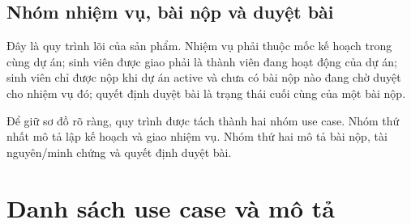 \figProjectTeamUseCases

\subsection{Nhóm nhiệm vụ, bài nộp và duyệt bài}

Đây là quy trình lõi của sản phẩm. Nhiệm vụ phải thuộc mốc kế hoạch trong cùng dự án; sinh viên được giao phải là thành viên đang hoạt động của dự án; sinh viên chỉ được nộp khi dự án active và chưa có bài nộp nào đang chờ duyệt cho nhiệm vụ đó; quyết định duyệt bài là trạng thái cuối cùng của một bài nộp.

Để giữ sơ đồ rõ ràng, quy trình được tách thành hai nhóm use case. Nhóm thứ nhất mô tả lập kế hoạch và giao nhiệm vụ. Nhóm thứ hai mô tả bài nộp, tài nguyên/minh chứng và quyết định duyệt bài.

\figAssignmentPlanUseCases

\figSubmissionReviewUseCases

\section{Danh sách use case và mô tả}

